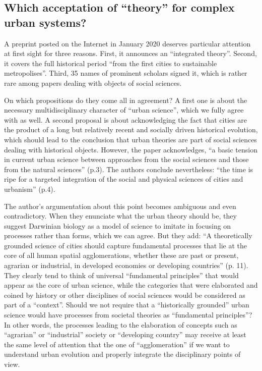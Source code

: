 \documentclass[10pt]{article}
\begin{document}
\subsection{Which acceptation of ``theory'' for complex urban systems?}

A preprint posted on the Internet in January 2020 \citep{lobo2020urban} deserves particular attention at first sight for three reasons. First, it announces an ``integrated theory''. Second, it covers the full historical period ``from the first cities to sustainable metropolises''. Third, 35 names of prominent scholars signed it, which is rather rare among papers dealing with objects of social sciences.

On which propositions do they come all in agreement? A first one is about the necessary multidisciplinary character of ``urban science'', which we fully agree with as well. A second proposal is about acknowledging the fact that cities are the product of a long but relatively recent and socially driven historical evolution, which should lead to the conclusion that urban theories are part of social sciences dealing with historical objects. However, the paper acknowledges, ``a basic tension in current urban science between approaches from the social sciences and those from the natural sciences'' (p.3). The authors conclude nevertheless: ``the time is ripe for a targeted integration of the social and physical sciences of cities and urbanism'' (p.4).

The author’s argumentation about this point becomes ambiguous and even contradictory. When they enunciate what the urban theory should be, they suggest Darwinian biology as a model of science to imitate in focusing on processes rather than forms, which we can agree. But they add: ``A theoretically grounded science of cities should capture fundamental processes that lie at the core of all human spatial agglomerations, whether these are past or present, agrarian or industrial, in developed economies or developing countries'' (p. 11). They clearly tend to think of universal ``fundamental principles'' that would appear as the core of urban science, while the categories that were elaborated and coined by history or other disciplines of social sciences would be considered as part of a “context”. Should we not require that a “historically grounded” urban science would have processes from societal theories as ``fundamental principles''? In other words, the processes leading to the elaboration of concepts such as ``agrarian'' or ``industrial'' society or ``developing country'' may receive at least the same level of attention that the one of ``agglomeration'' if we want to understand urban evolution and properly integrate the disciplinary points of view.
\end{document}
